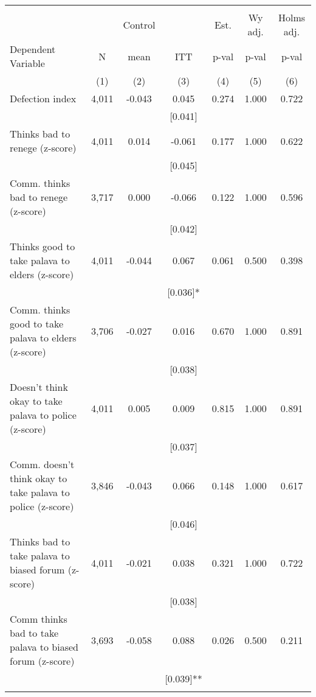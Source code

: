 \begin{tabular}{lcccccc}
\hline \noalign{\smallskip} &  &  &  &  &  & \\
 &  & Control &  & Est. & Wy adj. & Holms adj.\\
Dependent Variable & N & mean & ITT & p-val & p-val & p-val\\
 & (1) & (2) & (3) & (4) & (5) & (6)\\
\noalign{\smallskip}\hline \noalign{\smallskip}\quad Defection index & 4,011 & -0.043 & 0.045 & 0.274 & 1.000 & 0.722\\
 &  &  & [0.041] &  &  & \\
\quad Thinks bad to renege (z-score) & 4,011 & 0.014 & -0.061 & 0.177 & 1.000 & 0.622\\
 &  &  & [0.045] &  &  & \\
\quad Comm. thinks bad to renege (z-score) & 3,717 & 0.000 & -0.066 & 0.122 & 1.000 & 0.596\\
 &  &  & [0.042] &  &  & \\
\quad Thinks good to take palava to elders (z-score) & 4,011 & -0.044 & 0.067 & 0.061 & 0.500 & 0.398\\
 &  &  & [0.036]* &  &  & \\
\quad Comm. thinks good to take palava to elders (z-score) & 3,706 & -0.027 & 0.016 & 0.670 & 1.000 & 0.891\\
 &  &  & [0.038] &  &  & \\
\quad Doesn't think okay to take palava to police (z-score) & 4,011 & 0.005 & 0.009 & 0.815 & 1.000 & 0.891\\
 &  &  & [0.037] &  &  & \\
\quad Comm. doesn't think okay to take palava to police (z-score) & 3,846 & -0.043 & 0.066 & 0.148 & 1.000 & 0.617\\
 &  &  & [0.046] &  &  & \\
\quad Thinks bad to take palava to biased forum (z-score) & 4,011 & -0.021 & 0.038 & 0.321 & 1.000 & 0.722\\
 &  &  & [0.038] &  &  & \\
\quad Comm thinks bad to take palava to biased forum (z-score) & 3,693 & -0.058 & 0.088 & 0.026 & 0.500 & 0.211\\
 &  &  & [0.039]** &  &  & \\
\noalign{\smallskip}\hline\end{tabular}
